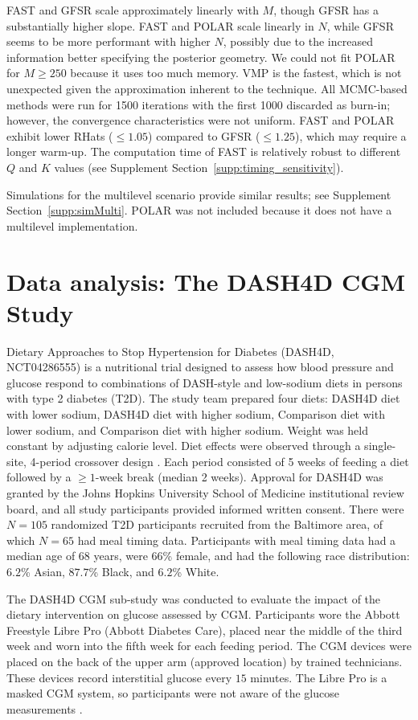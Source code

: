 \documentclass[12pt]{article}
\begin{document}
FAST and GFSR scale approximately linearly with $M$, though GFSR has a substantially higher slope. FAST and POLAR scale linearly in $N$, while GFSR seems to be more performant with higher $N$, possibly due to the increased information better specifying the posterior geometry. We could not fit POLAR for $M \geq 250$ because it uses too much memory. VMP is the fastest, which is not unexpected given the approximation inherent to the technique. All MCMC-based methods were run for 1500 iterations with the first 1000 discarded as burn-in; however, the convergence characteristics were not uniform. FAST and POLAR exhibit lower RHats ($\leq 1.05$) compared to GFSR ($\leq 1.25$), which may require a longer warm-up. The computation time of FAST is relatively robust to different $Q$ and $K$ values (see Supplement Section~\ref{supp:timing_sensitivity}).

Simulations for the multilevel scenario provide  similar results; see Supplement Section~\ref{supp:simMulti}. POLAR was not included because it does not have a multilevel implementation. 

\section{Data analysis: The DASH4D CGM Study}\label{sec:data_analysis}

Dietary Approaches to Stop Hypertension for Diabetes (DASH4D, NCT04286555) is a nutritional trial designed to assess how blood pressure and glucose respond to combinations of DASH-style and low-sodium diets in persons with type 2 diabetes (T2D). The study team prepared four diets: DASH4D diet with lower sodium, DASH4D diet with higher sodium, Comparison diet with lower sodium, and Comparison diet with higher sodium. Weight was held constant by adjusting calorie level. Diet effects were observed through a single-site, 4-period crossover design \citep{pilla_dietary_2025}. Each period consisted of 5 weeks of feeding a diet followed by a $\geq1$-week break (median 2 weeks). Approval for DASH4D was granted by the Johns Hopkins University School of Medicine institutional review board, and all study participants provided informed written consent. There were $N = 105$ randomized T2D participants recruited from the Baltimore area, of which $N = 65$ had meal timing data. Participants with meal timing data had a median age of $68$ years, were $66$\% female, and had the following race distribution: $6.2$\% Asian, $87.7$\% Black, and $6.2$\% White. 

The DASH4D CGM sub-study was conducted to evaluate the impact of the dietary intervention on glucose assessed by CGM. Participants wore the Abbott Freestyle Libre Pro (Abbott Diabetes Care), placed near the middle of the third week and worn into the fifth week for each feeding period. The CGM devices were placed on the back of the upper arm (approved location) by trained technicians. These devices record interstitial glucose every $15$ minutes. The Libre Pro is a masked CGM system, so participants were not aware of the glucose measurements \citep{wang_design_2025}. 
\end{document}

